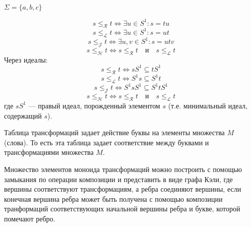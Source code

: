 \documentclass[14pt, russian]{scrartcl}
\begin{document}
\begin{Example}[Алфавит]
  $\Sigma = \{a, b, c\}$
\end{Example}

\begin{Definition}
  \begin{equation}
    s \leq_{\mathcal{R}} t \Leftrightarrow \exists u \in S^{1} : s = tu
  \end{equation}
  \begin{equation}
    s \leq_{\mathcal{L}} t \Leftrightarrow \exists u \in S^{1} : s = ut
  \end{equation}
  \begin{equation}
    s \leq_{\mathcal{J}} t \Leftrightarrow \exists u, v \in S^{1} : s = utv
  \end{equation}
  \begin{equation}
    s \leq_{\mathcal{H}} t \Leftrightarrow s \leq_{\mathcal{R}} t \quad{}\text{и}\quad{} s \leq_{\mathcal{L}} t
  \end{equation}
  Через идеалы:
  \begin{equation}
    s \leq_{\mathcal{R}} t \Leftrightarrow s S^{1} \subseteq t S^{1}
  \end{equation}
  \begin{equation}
    s \leq_{\mathcal{L}} t \Leftrightarrow S^{1}s  \subseteq S^{1} t
  \end{equation}
  \begin{equation}
    s \leq_{\mathcal{J}} t \Leftrightarrow S^{1}s S^{1}  \subseteq S^{1} t S^{1}
  \end{equation}
  \begin{equation}
    s \leq_{\mathcal{H}} t \Leftrightarrow s \leq_{\mathcal{R}} t \quad{}\text{и}\quad{} s \leq_{\mathcal{L}} t
  \end{equation}
  где $sS^{1}$ --- правый идеал, порожденный элементом $s$ (т.е. минимальный
  идеал, содержащий $s$).
\end{Definition}

Таблица трансформаций задает действие буквы на элементы множества $M$ (слова).
То есть эта таблица задает соответствие между буквами и трансформациями
множества $M$.

Множество элементов моноида трансформаций можно построить с помощью замыкания по
операции композиции и представить в виде графа Кэли, где вершины соответствуют
трансформациям, а ребра соединяют вершины, если конечная вершина ребра может
быть получена с помощью композиции транформаций соответствующих начальной
вершины ребра и букве, которой помечают ребро.
\end{document}
